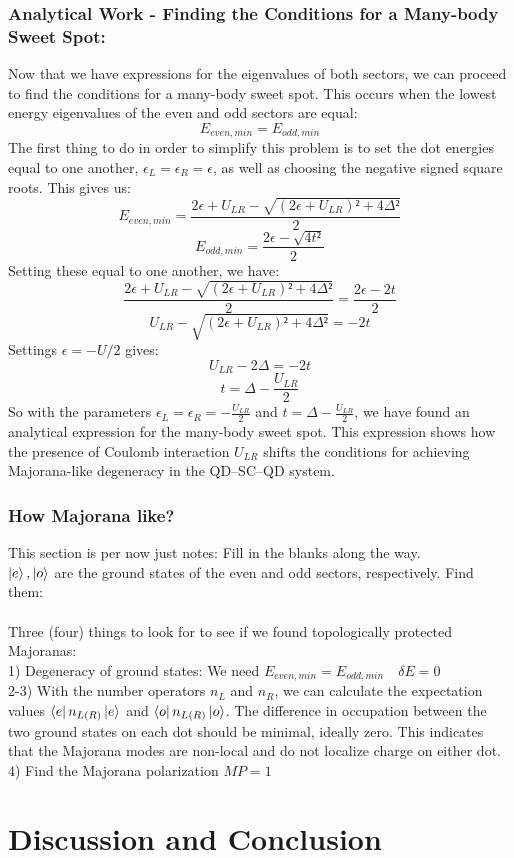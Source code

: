 \documentclass[11pt, letterpaper, titlepage]{article}
\begin{document}
\subsubsection{Analytical Work - Finding the Conditions for a Many-body Sweet Spot:}
Now that we have expressions for the eigenvalues of both sectors, we can proceed to find the conditions for a many-body sweet spot. This occurs when the lowest energy eigenvalues of the even and odd sectors are equal:
$$E_{even,min} = E_{odd,min}$$
The first thing to do in order to simplify this problem is to set the dot energies equal to one another, $ϵ_L = ϵ_R = ϵ$, as well as choosing the negative signed square roots. This gives us:
$$E_{even,min} = \frac{2ϵ + U_{LR} - \sqrt{(2ϵ + U_{LR})² + 4Δ²}}{2}$$
$$E_{odd,min} = \frac{2ϵ - \sqrt{4t²}}{2}$$
Setting these equal to one another, we have:
$$\frac{2ϵ + U_{LR} - \sqrt{(2ϵ + U_{LR})² + 4Δ²}}{2} = \frac{2ϵ - 2t}{2}$$
$$U_{LR} - \sqrt{(2ϵ + U_{LR})² + 4Δ²} = -2t$$
Settings $\epsilon= -U/2$ gives:
$$U_{LR} - 2Δ = -2t$$
$$t = Δ - \frac{U_{LR}}{2}$$
So with the parameters $ϵ_L = ϵ_R = -\frac{U_{LR}}{2}$ and $t = Δ - \frac{U_{LR}}{2}$, we have found an analytical expression for the many-body sweet spot. This expression shows how the presence of Coulomb interaction $U_{LR}$ shifts the conditions for achieving Majorana-like degeneracy in the QD–SC–QD system.
\subsubsection{How Majorana like?}
This section is per now just notes: Fill in the blanks along the way.\\
$\ket{e}, \ket{o}$ are the ground states of the even and odd sectors, respectively. Find them:\\\\
Three (four) things to look for to see if we found topologically protected Majoranas:\\
1) Degeneracy of ground states: We need $E_{even,min} = E_{odd,min}\quad  δE=0$\\
2-3) With the number operators $n_L$ and $n_R$, we can calculate the expectation values $\bra{e}n_{L(R)}\ket{e}$ and $\bra{o}n_{L(R)}\ket{o}$. The difference in occupation between the two ground states on each dot should be minimal, ideally zero. This indicates that the Majorana modes are non-local and do not localize charge on either dot.\\
4) Find the Majorana polarization $MP = 1$

\section{Discussion and Conclusion}
\end{document}
